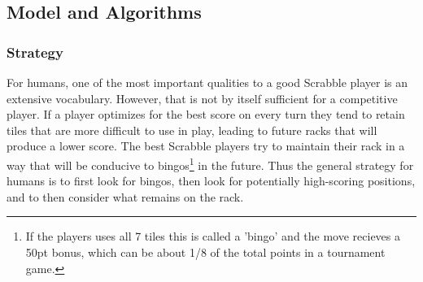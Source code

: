 \documentclass[12pt]{article}
\begin{document}
\subsection*{Model and Algorithms}

\subsubsection{Strategy}

For humans, one of the most important qualities to a good Scrabble
player is an extensive vocabulary. However, that is not by itself
sufficient for a competitive player. If a player optimizes for the
best score on every turn they tend to retain tiles that are more
difficult to use in play, leading to future racks that will produce a
lower score. The best Scrabble players try to maintain their rack in a
way that will be conducive to bingos\footnote{If the players uses all
  7 tiles this is called a 'bingo' and the move recieves a 50pt bonus,
  which can be about 1/8 of the total points in a tournament game.} in
the future. Thus the general strategy for humans is to first look for
bingos, then look for potentially high-scoring positions, and to then
consider what remains on the rack.
\end{document}
